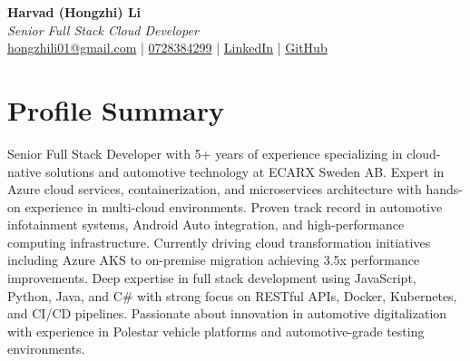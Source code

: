 \documentclass[11pt,a4paper]{article}
\begin{document}
\pagestyle{empty} %

\begin{center}
{\LARGE \textbf{Harvad (Hongzhi) Li}}\\[10pt]
{\Large \textit{Senior Full Stack Cloud Developer}}\\[10pt]
\textcolor{darkblue}{\href{mailto:hongzhili01@google.com}{hongzhili01@gmail.com} | \href{tel:0728384299}{0728384299} | \href{https://www.linkedin.com/in/harvad/}{LinkedIn} | \href{https://github.com/bluehawana}{GitHub}}
\end{center}

\section*{Profile Summary}
Senior Full Stack Developer with 5+ years of experience specializing in cloud-native solutions and automotive technology at ECARX Sweden AB. Expert in Azure cloud services, containerization, and microservices architecture with hands-on experience in multi-cloud environments. Proven track record in automotive infotainment systems, Android Auto integration, and high-performance computing infrastructure. Currently driving cloud transformation initiatives including Azure AKS to on-premise migration achieving 3.5x performance improvements. Deep expertise in full stack development using JavaScript, Python, Java, and C\# with strong focus on RESTful APIs, Docker, Kubernetes, and CI/CD pipelines. Passionate about innovation in automotive digitalization with experience in Polestar vehicle platforms and automotive-grade testing environments.

\end{document}

